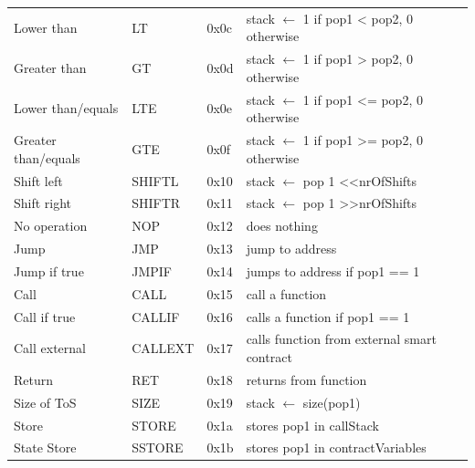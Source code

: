 \begin{table}[]
\begin{tabular}{@{}llll@{}}
Lower than           & LT                & 0x0c            & stack $\leftarrow$ 1 if pop1 \textless{} pop2, 0 otherwise            \\
Greater than         & GT                & 0x0d            & stack $\leftarrow$ 1 if pop1 \textgreater{} pop2, 0 otherwise         \\
Lower than/equals    & LTE               & 0x0e            & stack $\leftarrow$ 1 if pop1 \textless{}= pop2, 0 otherwise         \\
Greater than/equals  & GTE               & 0x0f            & stack $\leftarrow$ 1 if pop1 \textgreater{}= pop2, 0 otherwise      \\
Shift left           & SHIFTL            & 0x10            & stack $\leftarrow$ pop 1 \textless{}\textless nrOfShifts            \\
Shift right          & SHIFTR            & 0x11            & stack $\leftarrow$ pop 1 \textgreater{}\textgreater nrOfShifts      \\
No operation         & NOP               & 0x12            & does nothing                                             \\
Jump                 & JMP               & 0x13            & jump to address                                          \\
Jump if true         & JMPIF             & 0x14            & jumps to address if pop1 == 1                            \\
Call                 & CALL              & 0x15            & call a function                                          \\
Call if true         & CALLIF            & 0x16            & calls a function if pop1 == 1                            \\
Call external        & CALLEXT           & 0x17            & calls function from external smart contract              \\
Return               & RET               & 0x18            & returns from function                                    \\
Size of ToS          & SIZE              & 0x19            & stack $\leftarrow$ size(pop1)                                       \\
Store                & STORE             & 0x1a            & stores pop1 in callStack                                 \\
State Store          & SSTORE            & 0x1b            & stores pop1 in contractVariables                         \\

\end{tabular}
\end{table}
